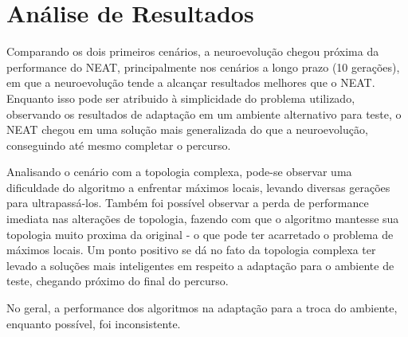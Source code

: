 \section{Análise de Resultados}

Comparando os dois primeiros cen{\'a}rios, a
neuroevolu{\c c}{\~a}o chegou próxima da
performance do NEAT, principalmente nos
cen{\'a}rios a longo prazo (10 gera{\c
c}{\~o}es), em que a neuroevolu{\c c}{\~a}o
tende a alcan{\c c}ar resultados
melhores que o NEAT. Enquanto isso pode ser
atribuido {\`a} simplicidade do problema
utilizado, observando os resultados de adapta{\c
c}{\~a}o em um ambiente alternativo para teste, o
NEAT chegou em uma solu{\c c}{\~a}o mais
generalizada do que a neuroevolu{\c c}{\~a}o,
conseguindo at{\'e} mesmo completar o percurso.

Analisando o cen{\'a}rio com a topologia
complexa, pode-se observar uma dificuldade do
algoritmo a enfrentar m{\'a}ximos locais,
levando diversas gera{\c c}{\~o}es para
ultrapass{\'a}-los. Tamb{\'e}m foi possível
observar a perda de performance imediata nas
altera{\c c}{\~o}es de topologia, fazendo com
que o algoritmo mantesse sua topologia muito
proxima da original - o que pode ter acarretado
o problema de m{\'a}ximos locais. Um ponto
positivo se dá no fato da topologia complexa ter levado a
solu{\c c}{\~o}es mais inteligentes em respeito
a adapta{\c c}{\~a}o para o ambiente de teste,
chegando pr{\'o}ximo do final do percurso.

No geral, a performance dos algoritmos na
adapta{\c c}{\~a}o para a troca do ambiente,
enquanto poss{\'i}vel, foi inconsistente.


